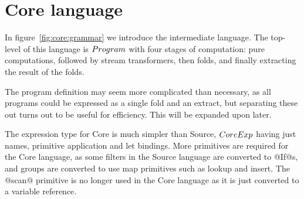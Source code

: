 \section{Core language}
\label{s:Core}

In figure~\ref{fig:core:grammar} we introduce the intermediate language.
The top-level of this language is $\mit{Program}$ with four stages of computation: pure computations, followed by stream transformers, then folds, and finally extracting the result of the folds.

The program definition may seem more complicated than necessary, as all programs could be expressed as a single fold and an extract, but separating these out turns out to be useful for efficiency.
This will be expanded upon later.

The expression type for Core is much simpler than Source, $\mit{CoreExp}$ having just names, primitive application and let bindings.
More primitives are required for the Core language, as some filters in the Source language are converted to @If@s, and groups are converted to use map primitives such as lookup and insert.
The @scan@ primitive is no longer used in the Core language as it is just converted to a variable reference.











